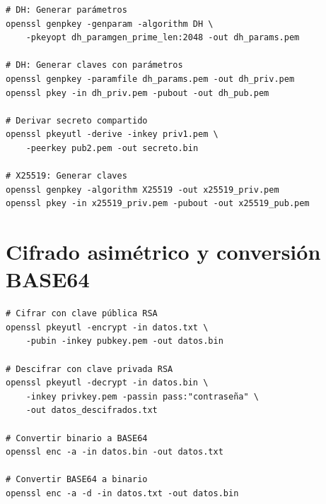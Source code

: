 \documentclass[12pt,a4paper]{report}
\begin{document}
\begin{lstlisting}[caption=Comandos para derivación DH y X25519]
# DH: Generar parámetros
openssl genpkey -genparam -algorithm DH \
    -pkeyopt dh_paramgen_prime_len:2048 -out dh_params.pem

# DH: Generar claves con parámetros
openssl genpkey -paramfile dh_params.pem -out dh_priv.pem
openssl pkey -in dh_priv.pem -pubout -out dh_pub.pem

# Derivar secreto compartido
openssl pkeyutl -derive -inkey priv1.pem \
    -peerkey pub2.pem -out secreto.bin

# X25519: Generar claves
openssl genpkey -algorithm X25519 -out x25519_priv.pem
openssl pkey -in x25519_priv.pem -pubout -out x25519_pub.pem
\end{lstlisting}

\section{Cifrado asimétrico y conversión BASE64}

\begin{lstlisting}[caption=Comandos para cifrado asimétrico]
# Cifrar con clave pública RSA
openssl pkeyutl -encrypt -in datos.txt \
    -pubin -inkey pubkey.pem -out datos.bin

# Descifrar con clave privada RSA
openssl pkeyutl -decrypt -in datos.bin \
    -inkey privkey.pem -passin pass:"contraseña" \
    -out datos_descifrados.txt

# Convertir binario a BASE64
openssl enc -a -in datos.bin -out datos.txt

# Convertir BASE64 a binario
openssl enc -a -d -in datos.txt -out datos.bin
\end{lstlisting}
\end{document}
